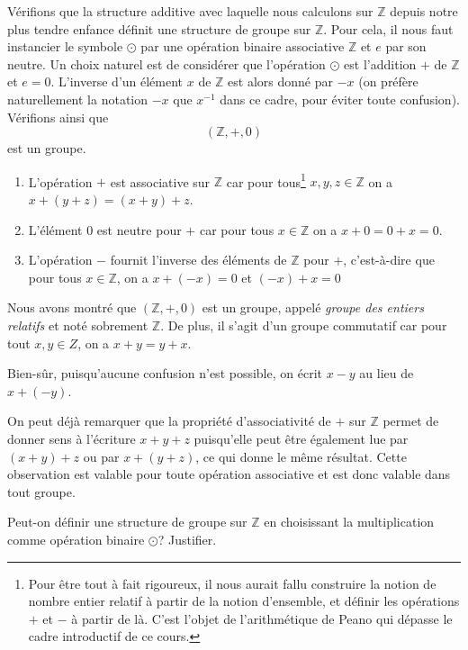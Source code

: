\documentclass[french,course,oneside,theoremnosection]{lecture}
\newcommand{\Z}{\mathbb{Z}}
\begin{document}
\begin{example}[$\Z$, le groupe des entiers relatifs] Vérifions que la structure additive avec laquelle nous calculons sur $\Z$ depuis notre plus tendre enfance définit une structure de groupe sur $\Z$. Pour cela, il nous faut instancier le symbole $\odot$ par une opération binaire associative $\Z$ et $e$ par son neutre. Un choix naturel est de considérer que l'opération $\odot$ est l'addition $+$ de $\Z$ et $e=0$. L'inverse d'un élément $x$ de $\Z$ est alors donné par $-x$ (on préfère naturellement la notation $-x$ que $x^{-1}$ dans ce cadre, pour éviter toute confusion). Vérifions ainsi que 
\[
(\Z, +, 0)
\] 
est un groupe. 
\begin{enumerate}
\item L'opération $+$ est associative sur $\Z$ car pour tous\footnote{Pour être tout à fait rigoureux, il nous aurait fallu construire la notion de nombre entier relatif à partir de la notion d'ensemble, et définir les opérations $+$ et $-$ à partir de là. C'est l'objet de l'arithmétique de Peano qui dépasse le cadre introductif de ce cours.} $x,y,z \in \Z$ on a $x+(y+z)=(x+y)+z$.
\item L'élément $0$ est neutre pour $+$ car pour tous $x\in \Z$ on a $x+0=0+x=0$.
\item L'opération $-$ fournit l'inverse des éléments de $\Z$ pour $+$, c'est-à-dire que pour tous $x\in \Z$, on a $x+(-x)=0$ et $(-x)+x=0$
\end{enumerate}
Nous avons montré que $(\Z, +, 0)$ est un groupe, appelé \emph{groupe des entiers relatifs} et noté sobrement $\Z$. De plus, il s'agit d'un groupe commutatif car pour tout $x,y \in Z$, on a $x + y = y + x$.

Bien-sûr, puisqu'aucune confusion n'est possible, on écrit $x-y$ au lieu de $x+(-y)$.
\end{example} 
\begin{remark}
On peut déjà remarquer que la propriété d'associativité de $+$ sur $\Z$ permet de donner sens à l'écriture $x+y+z$ puisqu'elle peut être également lue par $(x+y)+z$ ou par $x+(y+z)$, ce qui donne le même résultat. Cette observation est valable pour toute opération associative et est donc valable dans tout groupe.
\end{remark}

\begin{exercise}
Peut-on définir une structure de groupe sur $\Z$ en choisissant la multiplication comme opération binaire $\odot$? Justifier.
\end{exercise}
\end{document}
